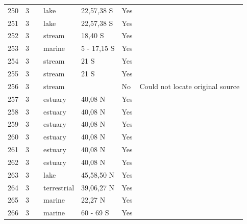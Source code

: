 \documentclass[12pt]{article}
\begin{document}
\begin{landscape}
\begin{table}[h!]
{\begin{tabular}{p{2.8cm}p{1.3cm}p{3cm}p{2.2cm}p{2.5cm}lp{8.2cm}}
        250   & 3 & \cite{Angelini2006}  & lake  & 22,57,38 S & Yes  &     \\
        251   & 3 & \cite{Angelini2006}  & lake  & 22,57,38 S & Yes  &     \\
        252   & 3 & \cite{Angelini2010}  & stream & 18,40 S & Yes  &     \\
        253   & 3 & \cite{Angelini2011}  & marine & 5 - 17,15 S & Yes  &     \\
        254   & 3 & \cite{Angelini2013}  & stream & 21 S  & Yes  &     \\
        255   & 3 & \cite{Angelini2013}  & stream & 21 S  & Yes  &     \\
        256   & 3 & \cite{Angelini2013}  & stream &       & No    & Could not locate original source \\
        257   & 3 & \cite{Baeta2011}  & estuary & 40,08 N & Yes  &     \\
        258   & 3 & \cite{Baeta2011}  & estuary & 40,08 N & Yes  &     \\
        259   & 3 & \cite{Baeta2011}  & estuary & 40,08 N & Yes  &     \\
        260   & 3 & \cite{Baeta2011}  & estuary & 40,08 N & Yes  &     \\
        261   & 3 & \cite{Baeta2011}  & estuary & 40,08 N & Yes  &     \\
        262   & 3 & \cite{Baeta2011}  & estuary & 40,08 N & Yes  &     \\
        263   & 3 & \cite{Schneider1997}    & lake  & 45,58,50 N & Yes   &       \\
        264   & 3 & \cite{Stagliano2002}    & terrestrial & 39,06,27 N & Yes   &       \\
        265   & 3 & \cite{Lin2006}  & marine & 22,27 N & Yes  &     \\
        266   & 3 & \cite{Cornejo-Donoso2008}  & marine & 60 - 69 S & Yes  &     \\
         \hline
      \end{tabular}}%
      \end{table}

        \newpage


\end{landscape}
\end{document}
